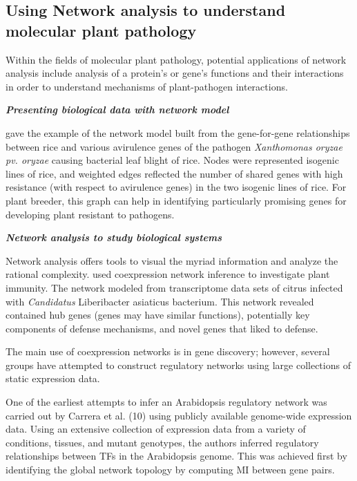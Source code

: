 \subsection*{Using Network analysis to understand molecular plant pathology}

Within the fields of molecular plant pathology, potential applications of network analysis include analysis of a protein’s or gene’s functions and their interactions in order to understand mechanisms of plant-pathogen interactions.

\textit{\textbf{Presenting biological data with network model}}

 gave the example of the network model built from the gene-for-gene relationships between rice and various avirulence genes of the pathogen \textit{Xanthomonas oryzae pv. oryzae} causing bacterial leaf blight of rice. Nodes were represented isogenic lines of rice, and weighted edges reflected the number of shared genes with high resistance (with respect to avirulence genes) in the two isogenic lines of rice. For plant breeder, this graph can help in identifying particularly promising genes for developing plant resistant to pathogens. 



\textit{\textbf{Network analysis to study biological systems}}

Network analysis offers tools to visual the myriad information and analyze the rational complexity.  used coexpression network inference to investigate plant immunity. The network modeled from transcriptome data sets of citrus infected with \textit{Candidatus} Liberibacter asiaticus bacterium. This network revealed contained hub genes (genes may have similar functions), potentially key components of defense mechanisms, and novel genes that liked to defense. 


The main use of coexpression networks is in gene discovery; however, several groups have attempted to construct regulatory networks using large collections of static expression data. 


One of the earliest attempts to infer an Arabidopsis regulatory network was carried out by Carrera et al. (10) using publicly available genome-wide expression data. Using an extensive collection of expression data from a variety of conditions, tissues, and mutant genotypes, the authors inferred regulatory relationships between TFs in the Arabidopsis genome. This was achieved first by identifying the global network topology by computing MI between gene pairs. 

